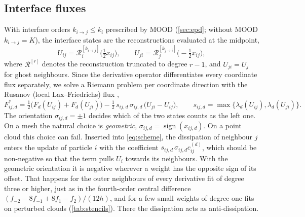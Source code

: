 \documentclass[11pt,a4paper]{article}
\numberwithin{equation}{section}
\newcommand{\Fs}{F^{*}}
\newcommand{\sgn}{\operatorname{sign}}
\newcommand{\ord}[2]{k_{#1\to #2}}
\begin{document}
\subsection{Interface fluxes}\label{sec:fluxes}

With interface orders $\ord ij\le k_i$ prescribed by MOOD (\cref{sec:epd}; without MOOD $\ord ij=K$), the interface states are the reconstructions evaluated at the midpoint,
\begin{equation}\label{eq:states}
U_{ij} = \mathcal{R}^{[\ord ij]}_i\big(\tfrac12 x_{ij}\big),\qquad U_{ji}=\mathcal{R}^{[\ord ji]}_j\big(-\tfrac12 x_{ij}\big),
\end{equation}
where $\mathcal{R}^{[r]}$ denotes the reconstruction truncated to degree $r-1$, and $U_{ji}=U_j$ for ghost neighbours. Since the derivative operator differentiates every coordinate flux separately, we solve a Riemann problem per coordinate direction with the Rusanov (local Lax--Friedrichs) flux \cite{Toro2009},
\begin{equation}\label{eq:rusanov}
\Fs_{ij,d} = \tfrac12\big(F_d(U_{ij})+F_d(U_{ji})\big) - \tfrac12\,s_{ij,d}\,\sigma_{ij,d}\,\big(U_{ji}-U_{ij}\big),\qquad
s_{ij,d} = \max\{\lambda_d(U_{ij}),\lambda_d(U_{ji})\}.
\end{equation}
The orientation $\sigma_{ij,d}=\pm1$ decides which of the two states counts as the left one. On a mesh the natural choice is \emph{geometric}, $\sigma_{ij,d}=\sgn(x_{ij,d})$. On a point cloud this choice can fail. Inserted into \eqref{eq:scheme}, the dissipation of neighbour $j$ enters the update of particle $i$ with the coefficient $s_{ij,d}\,\sigma_{ij,d}c^{(d)}_{ij}$, which should be non-negative so that the term pulls $U_i$ towards its neighbours. With the geometric orientation it is negative wherever a weight has the opposite sign of its offset. That happens for the outer neighbours of every derivative fit of degree three or higher, just as in the fourth-order central difference $(f_{-2}-8f_{-1}+8f_1-f_2)/(12h)$, and for a few small weights of degree-one fits on perturbed clouds (\cref{tab:stencils}). There the dissipation acts as anti-dissipation.
\end{document}

